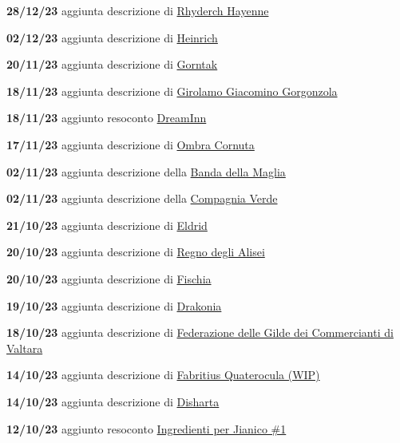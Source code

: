 \textbf{28/12/23} aggiunta descrizione di
\href{Rhyderch\%20Hayenne\%206610a64fc35e4039b41c497c2b1fd25b.md}{Rhyderch
Hayenne}

\textbf{02/12/23} aggiunta descrizione di
\href{Heinrich\%205b35365396bf49d4905ebdfc9d28aef9.md}{Heinrich}

\textbf{20/11/23} aggiunta descrizione di
\href{Gorntak\%20e9f1a45561dd456390238d8354a583f1.md}{Gorntak}

\textbf{18/11/23} aggiunta descrizione di
\href{Girolamo\%20Giacomino\%20Gorgonzola\%208992648336664c4ab50e239a8554805c.md}{Girolamo
Giacomino Gorgonzola}

\textbf{18/11/23} aggiunto resoconto
\href{DreamInn\%2072fbcba4665545a7801567903cc0efeb.md}{DreamInn}

\textbf{17/11/23} aggiunta descrizione di
\href{Ombra\%20Cornuta\%206141fe0afbd94cc6ace6561edcae515f.md}{Ombra
Cornuta}

\textbf{02/11/23} aggiunta descrizione della
\href{Banda\%20della\%20Maglia\%205a4073f0c04340fdaca5080aa0d16f3c.md}{Banda
della Maglia}

\textbf{02/11/23} aggiunta descrizione della
\href{Compagnia\%20Verde\%2061130611054349ab88fc486629b19815.md}{Compagnia
Verde}

\textbf{21/10/23} aggiunta descrizione di
\href{Eldrid\%20bd820bb9f6164b39ae6e611a94748518.md}{Eldrid}

\textbf{20/10/23} aggiunta descrizione di
\href{Regno\%20degli\%20Alisei\%20fe51ba5ed20444ddb0d5a27386756b8a.md}{Regno
degli Alisei}

\textbf{20/10/23} aggiunta descrizione di
\href{Fischia\%20dab4198b0224463fb3718810405ed728.md}{Fischia}

\textbf{19/10/23} aggiunta descrizione di
\href{Drakonia\%207646694c0d12453293a9b7e41d5cdb15.md}{Drakonia}

\textbf{18/10/23} aggiunta descrizione di
\href{Federazione\%20delle\%20Gilde\%20dei\%20Commercianti\%20di\%20Valtar\%20b3d5ff4079ed4e1bbcc732dd063fcb27.md}{Federazione
delle Gilde dei Commercianti di Valtara}

\textbf{14/10/23} aggiunta descrizione di
\href{Fabritius\%20Quaterocula\%20(WIP)\%207630fc05bd5844eba3c7c74d3184a355.md}{Fabritius
Quaterocula (WIP)}

\textbf{14/10/23} aggiunta descrizione di
\href{Disharta\%2093276c893b6d4deeae0bbd665342a335.md}{Disharta}

\textbf{12/10/23} aggiunto resoconto
\href{Ingredienti\%20per\%20Jianico\%20\#1\%20b95fa50e7c954f4f92b96e2a1f48d0c1.md}{Ingredienti
per Jianico \#1}

